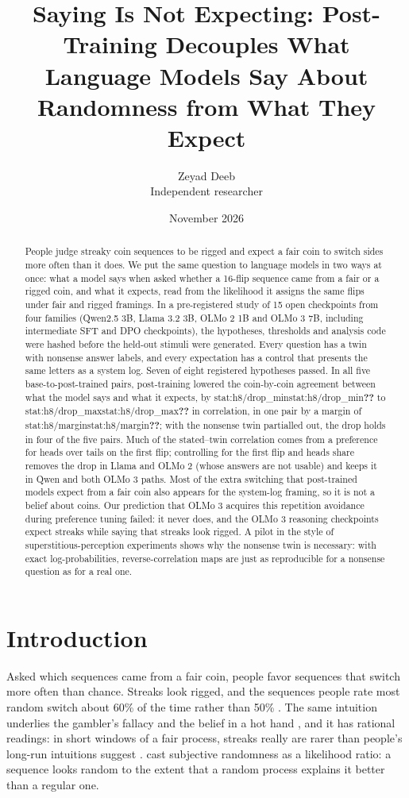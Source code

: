 \documentclass[11pt]{article}
\title{Saying Is Not Expecting: Post-Training Decouples What Language Models Say About Randomness from What They Expect}
\author{Zeyad Deeb\\ Independent researcher}
\date{November 2026}
\newcommand{\stat}[1]{\ifcsname stat:#1\endcsname\csname stat:#1\endcsname\else\textbf{??}\fi}
\begin{document}
\maketitle

\begin{abstract}
People judge streaky coin sequences to be rigged and expect a fair coin to switch sides more often than it does. We put the same question to language models in two ways at once: what a model says when asked whether a 16-flip sequence came from a fair or a rigged coin, and what it expects, read from the likelihood it assigns the same flips under fair and rigged framings. In a pre-registered study of 15 open checkpoints from four families (Qwen2.5 3B, Llama 3.2 3B, OLMo 2 1B and OLMo 3 7B, including intermediate SFT and DPO checkpoints), the hypotheses, thresholds and analysis code were hashed before the held-out stimuli were generated. Every question has a twin with nonsense answer labels, and every expectation has a control that presents the same letters as a system log. Seven of eight registered hypotheses passed. In all five base-to-post-trained pairs, post-training lowered the coin-by-coin agreement between what the model says and what it expects, by \stat{h8/drop_min} to \stat{h8/drop_max} in correlation, in one pair by a margin of \stat{h8/margin}; with the nonsense twin partialled out, the drop holds in four of the five pairs. Much of the stated--twin correlation comes from a preference for heads over tails on the first flip; controlling for the first flip and heads share removes the drop in Llama and OLMo 2 (whose answers are not usable) and keeps it in Qwen and both OLMo 3 paths. Most of the extra switching that post-trained models expect from a fair coin also appears for the system-log framing, so it is not a belief about coins. Our prediction that OLMo 3 acquires this repetition avoidance during preference tuning failed: it never does, and the OLMo 3 reasoning checkpoints expect streaks while saying that streaks look rigged. A pilot in the style of superstitious-perception experiments shows why the nonsense twin is necessary: with exact log-probabilities, reverse-correlation maps are just as reproducible for a nonsense question as for a real one.
\end{abstract}

\section{Introduction}

Asked which sequences came from a fair coin, people favor sequences that switch more often than chance. Streaks look rigged, and the sequences people rate most random switch about 60\% of the time rather than 50\% \citep{falk1997making,barhillel1991perception}. The same intuition underlies the gambler's fallacy and the belief in a hot hand \citep{kahneman1972subjective,gilovich1985hot}, and it has rational readings: in short windows of a fair process, streaks really are rarer than people's long-run intuitions suggest \citep{hahn2009perceptions}. \citet{griffiths2003algorithmic} cast subjective randomness as a likelihood ratio: a sequence looks random to the extent that a random process explains it better than a regular one.
\end{document}
